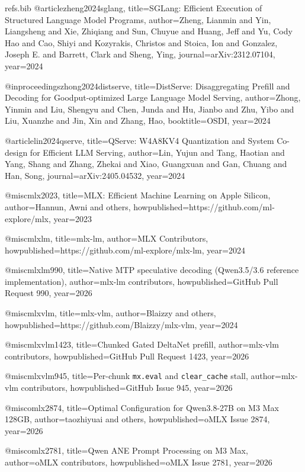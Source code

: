 \begin{filecontents*}[overwrite]{refs.bib}
@article{zheng2024sglang,
  title={{SGLang}: Efficient Execution of Structured Language Model Programs},
  author={Zheng, Lianmin and Yin, Liangsheng and Xie, Zhiqiang and Sun, Chuyue and Huang, Jeff and Yu, Cody Hao and Cao, Shiyi and Kozyrakis, Christos and Stoica, Ion and Gonzalez, Joseph E. and Barrett, Clark and Sheng, Ying},
  journal={arXiv:2312.07104},
  year={2024}
}

@inproceedings{zhong2024distserve,
  title={{DistServe}: Disaggregating Prefill and Decoding for Goodput-optimized Large Language Model Serving},
  author={Zhong, Yinmin and Liu, Shengyu and Chen, Junda and Hu, Jianbo and Zhu, Yibo and Liu, Xuanzhe and Jin, Xin and Zhang, Hao},
  booktitle={OSDI},
  year={2024}
}

@article{lin2024qserve,
  title={{QServe}: {W4A8KV4} Quantization and System Co-design for Efficient {LLM} Serving},
  author={Lin, Yujun and Tang, Haotian and Yang, Shang and Zhang, Zhekai and Xiao, Guangxuan and Gan, Chuang and Han, Song},
  journal={arXiv:2405.04532},
  year={2024}
}

@misc{mlx2023,
  title={{MLX}: Efficient Machine Learning on {Apple} Silicon},
  author={Hannun, Awni and others},
  howpublished={https://github.com/ml-explore/mlx},
  year={2023}
}

@misc{mlxlm,
  title={{mlx-lm}},
  author={{MLX Contributors}},
  howpublished={https://github.com/ml-explore/mlx-lm},
  year={2024}
}

@misc{mlxlm990,
  title={Native {MTP} speculative decoding ({Qwen3.5}/{3.6} reference implementation)},
  author={{mlx-lm contributors}},
  howpublished={GitHub Pull Request 990},
  year={2026}
}

@misc{mlxvlm,
  title={{mlx-vlm}},
  author={Blaizzy and others},
  howpublished={https://github.com/Blaizzy/mlx-vlm},
  year={2024}
}

@misc{mlxvlm1423,
  title={Chunked {Gated DeltaNet} prefill},
  author={{mlx-vlm contributors}},
  howpublished={GitHub Pull Request 1423},
  year={2026}
}

@misc{mlxvlm945,
  title={Per-chunk \texttt{mx.eval} and \texttt{clear\_cache} stall},
  author={{mlx-vlm contributors}},
  howpublished={GitHub Issue 945},
  year={2026}
}

@misc{omlx2874,
  title={Optimal Configuration for {Qwen3.8-27B} on {M3 Max} 128{GB}},
  author={taozhiyuai and others},
  howpublished={oMLX Issue 2874},
  year={2026}
}

@misc{omlx2781,
  title={{Qwen} {ANE} Prompt Processing on {M3 Max}},
  author={{oMLX contributors}},
  howpublished={oMLX Issue 2781},
  year={2026}
}


\end{filecontents*}
